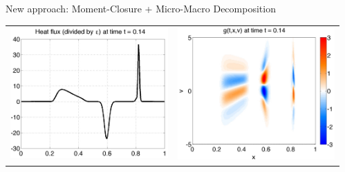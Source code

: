 \documentclass[final,hyperref={pdfpagelabels=false}]{beamer}
\begin{document}
\begin{frame}[t]
\begin{columns}[t]
\begin{column}{.31\textwidth}
\begin{block}{New approach: Moment-Closure + Micro-Macro Decomposition}
\begin{itemize}
\begin{center}
\begin{tabular}{cc}
\includegraphics[width=110mm]{hbgk_heatflux_1em3.jpg} &
\includegraphics[width=110mm]{hbgk_g_1em3.jpg}
\end{tabular}
\end{center}
\end{itemize}
\end{block}


\end{column} %

\begin{column}{.015\textwidth}\end{column} %

\end{columns} %

\end{frame} %
\end{document}
